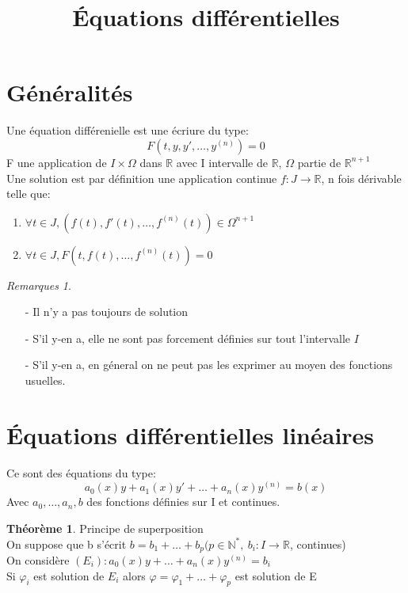 \documentclass[fleqn]{article}
\title{\'Equations diff\'erentielles}
\date{}
\theoremstyle{definition} \newtheorem*{defi}{D\'efinition}
\theoremstyle{definition} \newtheorem*{theo}{Th\'eor\`eme}
\theoremstyle{remark} \newtheorem*{rqs}{Remarques}
\begin{document}
\maketitle

\section{G\'en\'eralit\'es}
Une \'equation diff\'erenielle est une \'ecriure du type:
\[F(t, y, y', \hdots, y^{(n)}) = 0\]
F une application de $I \times \Omega$ dans $\mathbb{R}$ avec I intervalle de $\mathbb{R}$, $\Omega$ partie de $\mathbb{R}^{n+1}$\\
Une solution est par d\'efinition une application continue $f:J\rightarrow \mathbb{R}$, n fois d\'erivable telle que:
\begin{enumerate}
	\item $\forall t \in J, (f(t), f'(t), \hdots, f^{(n)}(t)) \in \Omega^{n+1}$
	\item $\forall t \in J, F(t, f(t), \hdots, f^{(n)}(t)) = 0$
\end{enumerate}

\begin{rqs} $ $
	\begin{itemize}
		\item [-] Il n'y a pas toujours de solution
		\item [-] S'il y-en a, elle ne sont pas forcement d\'efinies sur tout l'intervalle $I$
		\item [-] S'il y-en a, en g\'eneral on ne peut pas les exprimer au moyen des fonctions usuelles.
	\end{itemize}
\end{rqs}

\section{\'Equations diff\'erentielles lin\'eaires}
Ce sont des \'equations du type:
\[a_0(x)y + a_1(x)y' + \hdots + a_n(x)y^{(n)} = b(x)\]
Avec $a_0, \hdots, a_n, b$ des fonctions d\'efinies sur I et continues.\\

\begin{theo} Principe de superposition \\
	On suppose que b s'\'ecrit $b = b_1 + \hdots + b_p (p \in \mathbb{N}^{*},\ b_i : I \rightarrow \mathbb{R}$,  continues)\\
	On consid\`ere $(E_i): a_0(x)y + \hdots + a_n(x) y^{(n)} = b_i$ \\
	Si $\varphi_i$ est solution de $E_i$ alors $\varphi = \varphi_1 + \hdots + \varphi_p$ est solution de E
\end{theo}
\end{document}
